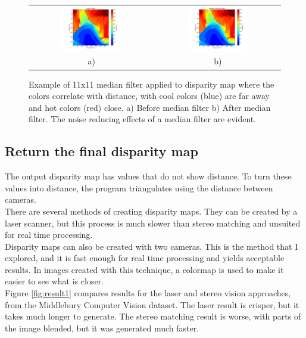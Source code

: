 \documentclass[11pt,fleqn]{article}
\begin{document}
\begin{figure}[!h]
\begin{mdframed}
\centering
\begin{tabular}{cc}
\includegraphics[width=0.49\textwidth, trim=60 10 25 10, clip]{images/median1.png} &
\includegraphics[width=0.49\textwidth, trim=60 10 25 10, clip]{images/median2.png}\\[2pt]
a) & b) \\
\end{tabular}
\caption[Example of 11x11 median filter applied to disparity map]{Example of 11x11 median filter applied to disparity map where the colors correlate with distance, with cool colors (blue) are far away and hot colors (red) close. a) Before median filter b) After median filter. 
The noise reducing effects of a median filter are evident.}
\label{fig:medians}
\end{mdframed}
\end{figure}
\subsection{Return the final disparity map}

The output disparity map has values that do not show distance. To turn these values into distance, the program triangulates using the distance between cameras.\\[5pt]
%
There are several methods of creating disparity maps. They can be created by a laser scanner, but this process is much slower than stereo matching and unsuited for real time processing. \\[5pt]
%
Disparity maps can also be created with two cameras. This is the method that I explored, and it is fast enough for real time processing and yields acceptable results. In images created with this technique, a colormap is used to make it easier to see what is closer.\\[5pt]
%
Figure \ref{fig:result1} compares results for the laser and stereo vision approaches, from the Middlebury Computer Vision dataset. The laser result is crisper, but it takes much longer to generate. The stereo matching result is worse, with parts of the image blended, but it was generated much faster. \\
\end{document}
